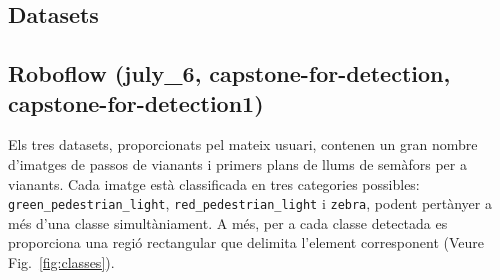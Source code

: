\documentclass[10pt,a4paper,twocolumn,twoside]{article}
\begin{document}
\subsection{Datasets}\label{sec:datasets}

\subsection*{Roboflow (july\_6, capstone-for-detection, capstone-for-detection1) \cite{RoboflowJuly6, RoboflowCapstone, RoboflowAugmented}}
Els tres datasets, proporcionats pel mateix usuari, contenen un gran nombre d'imatges de passos de vianants i primers plans de llums de semàfors per a vianants. Cada imatge està classificada en tres categories possibles: \texttt{green\_pedestrian\_light}, \texttt{red\_pedestrian\_light} i \texttt{zebra}, podent pertànyer a més d'una classe simultàniament. A més, per a cada classe detectada es proporciona una regió rectangular que delimita l'element corresponent (Veure Fig.~\ref{fig:classes}).
\end{document}
